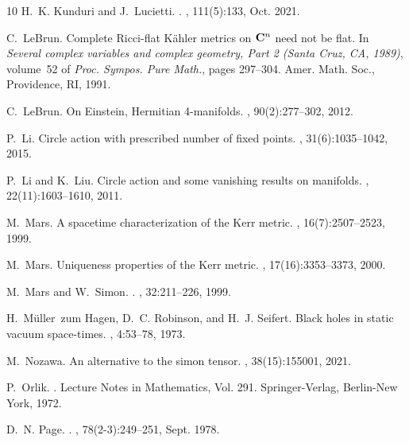 \documentclass[a4paper,10pt,reqno]{amsart}
\theoremstyle{plain}
\numberwithin{equation}{section}
\begin{document}
\begin{thebibliography}{10}
H.~K. {Kunduri} and J.~{Lucietti}.
.
, 111(5):133, Oct. 2021.

C.~LeBrun.
\newblock Complete {R}icci-flat {K}\"ahler metrics on {${\bf C}^n$} need not be
  flat.
\newblock In {\em Several complex variables and complex geometry, {P}art 2
  ({S}anta {C}ruz, {CA}, 1989)}, volume~52 of {\em Proc. Sympos. Pure Math.},
  pages 297--304. Amer. Math. Soc., Providence, RI, 1991.

C.~LeBrun.
\newblock On {E}instein, {H}ermitian 4-manifolds.
, 90(2):277--302, 2012.

P.~Li.
\newblock Circle action with prescribed number of fixed points.
, 31(6):1035--1042, 2015.

P.~Li and K.~Liu.
\newblock Circle action and some vanishing results on manifolds.
, 22(11):1603--1610, 2011.

M.~Mars.
\newblock A spacetime characterization of the {K}err metric.
, 16(7):2507--2523, 1999.

M.~Mars.
\newblock Uniqueness properties of the {K}err metric.
, 17(16):3353--3373, 2000.

M.~{Mars} and W.~{Simon}.
.
, 32:211--226, 1999.

H.~M\"{u}ller~zum Hagen, D.~C. Robinson, and H.~J. Seifert.
\newblock Black holes in static vacuum space-times.
, 4:53--78, 1973.

M.~Nozawa.
\newblock An alternative to the simon tensor.
, 38(15):155001, 2021.

P.~Orlik.
.
\newblock Lecture Notes in Mathematics, Vol. 291. Springer-Verlag, Berlin-New
  York, 1972.

D.~N. {Page}.
.
, 78(2-3):249--251, Sept. 1978.


\end{thebibliography}
\end{document}

